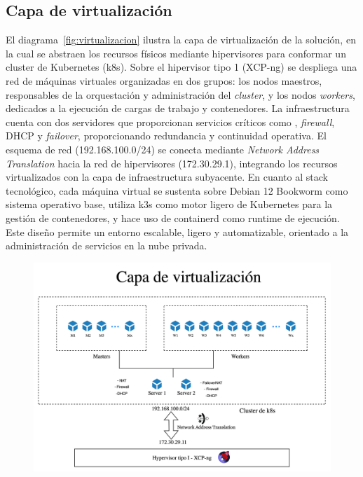 \subsection{Capa de virtualización}
\noindent
El diagrama~\ref{fig:virtualizacion} ilustra la capa de virtualización de la solución, en la cual se abstraen los recursos físicos mediante hipervisores para conformar un cluster de Kubernetes (k8s). Sobre el hipervisor tipo 1 (XCP-ng) se despliega una red de máquinas virtuales organizadas en dos grupos: los nodos maestros, responsables de la orquestación y administración del \textit{cluster}, y los nodos \textit{workers}, dedicados a la ejecución de cargas de trabajo y contenedores.
\noindent
La infraestructura cuenta con dos servidores que proporcionan servicios críticos como \NAT, \textit{firewall}, DHCP y \textit{failover}, proporcionando redundancia y continuidad operativa. El esquema de red (192.168.100.0/24) se conecta mediante \textit{Network Address Translation} hacia la red de hipervisores (172.30.29.1), integrando los recursos virtualizados con la capa de infraestructura subyacente.
\noindent
En cuanto al stack tecnológico, cada máquina virtual se sustenta sobre Debian 12 Bookworm como sistema operativo base, utiliza k3s como motor ligero de Kubernetes para la gestión de contenedores, y hace uso de containerd como runtime de ejecución. Este diseño permite un entorno escalable, ligero y automatizable, orientado a la administración de servicios en la nube privada.
\begin{figure}[H]
    \centering
    \includegraphics[width=\textwidth]{tablas-images/cp6/disenio-N2-A.png}
\end{figure}
